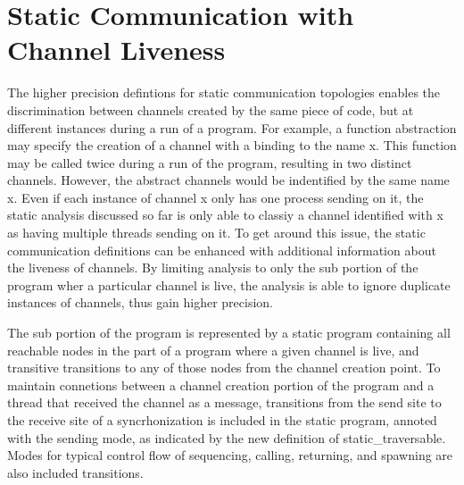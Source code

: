 \documentclass{article}
\begin{document}
\section{Static Communication with Channel Liveness }

The higher precision defintions for static communication topologies enables the discrimination
between channels created by the same piece of code, but at different instances during a run of
a program.  For example, a function abstraction may specify the creation of a channel with a
binding to the name x.  This function may be called twice during a run of the program,
resulting in two distinct channels.  However, the abstract channels would be indentified by the
same name x.  Even if each instance of channel x only has one process sending on it, the static
analysis discussed so far is only able to classiy a channel identified with x as having
multiple threads sending on it. To get around this issue, the static communication definitions
can be enhanced with additional information about the liveness of channels.  By limiting
analysis to only the sub portion of the program wher a particular channel is live, the analysis
is able to ignore duplicate instances of channels, thus gain higher precision. 

The sub portion of the program is represented by a static program containing all reachable nodes in the
part of a program where a given channel is live, and transitive transitions to any of those
nodes from the channel creation point.  To maintain connetions between a channel creation
portion of the program and a thread that received the channel as a message, transitions from
the send site to the receive site of a syncrhonization is included in the static program, annoted with
the sending mode, as indicated by the new definition of static\_traversable.  Modes for typical
control flow of sequencing, calling, returning, and spawning are also included transitions.
\end{document}
